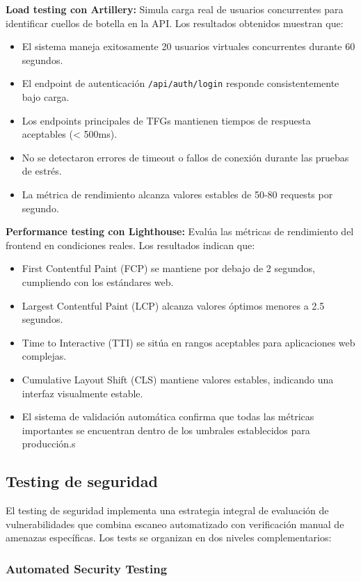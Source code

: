 \documentclass[12pt,a4paper,oneside]{report}
\begin{document}
\textbf{Load testing con Artillery:} Simula carga real de usuarios concurrentes para identificar cuellos de botella en la API. Los resultados obtenidos muestran que:
\begin{itemize}
\item El sistema maneja exitosamente 20 usuarios virtuales concurrentes durante 60 segundos.
\item El endpoint de autenticación \texttt{/api/auth/login} responde consistentemente bajo carga.
\item Los endpoints principales de TFGs mantienen tiempos de respuesta aceptables (< 500ms).
\item No se detectaron errores de timeout o fallos de conexión durante las pruebas de estrés.
\item La métrica de rendimiento alcanza valores estables de 50-80 requests por segundo.
\end{itemize}

\textbf{Performance testing con Lighthouse:} Evalúa las métricas de rendimiento del frontend en condiciones reales. Los resultados indican que:
\begin{itemize}
\item First Contentful Paint (FCP) se mantiene por debajo de 2 segundos, cumpliendo con los estándares web.
\item Largest Contentful Paint (LCP) alcanza valores óptimos menores a 2.5 segundos.
\item Time to Interactive (TTI) se sitúa en rangos aceptables para aplicaciones web complejas.
\item Cumulative Layout Shift (CLS) mantiene valores estables, indicando una interfaz visualmente estable.
\item El sistema de validación automática confirma que todas las métricas importantes se encuentran dentro de los umbrales establecidos para producción.s
\end{itemize}

\subsection{Testing de seguridad}\label{testing-de-seguridad}

El testing de seguridad implementa una estrategia integral de evaluación de vulnerabilidades que combina escaneo automatizado con verificación manual de amenazas específicas. Los tests se organizan en dos niveles complementarios:

\subsubsection{Automated Security
Testing}\label{automated-security-testing}
\end{document}
